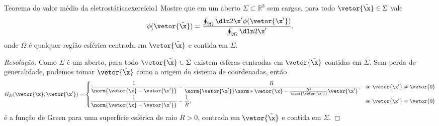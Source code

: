 \begin{exercício}{Teorema do valor médio da eletrostática}{exercício1}
    Mostre que em um aberto \(\Sigma\subset \mathbb{R}^3\) sem cargas, para todo \(\vetor{\tilde{\x}} \in \Sigma\) vale
    \begin{equation*}
        \phi(\vetor{\tilde{\x}}) = \frac{\oint_{\partial \Omega}\dln2{\x'} \phi(\vetor{\x'})}{\oint_{\partial \Omega} \dln2{\x'}},
    \end{equation*}
    onde \(\Omega\) é qualquer região esférica centrada em \(\vetor{\tilde{\x}}\) e contida em \(\Sigma\).
\end{exercício}
\begin{proof}[Resolução]
    Como \(\Sigma\) é um aberto, para todo \(\vetor{\tilde{\x}} \in \Sigma\) existem esferas centradas em \(\vetor{\tilde{\x}}\) contidas em \(\Sigma\). Sem perda de generalidade, podemos tomar \(\vetor{\tilde{\x}}\) como a origem do sistema de coordenadas, então
    \begin{equation*}
        G_D(\vetor{\x}, \vetor{\x'}) = \begin{cases}
            \dfrac{1}{\norm{\vetor{\x}-\vetor{\x'}}} - \dfrac{R}{\norm{\vetor{\x'}}\norm*{\vetor{\x} - \frac{R^2}{\norm{\vetor{\x'}}}\vetor{\x'}}},&\text{se }\vetor{\x'} \neq \vetor{0}\\
            \dfrac{1}{\norm{\vetor{\x}-\vetor{\x'}}} - \dfrac{1}{R},&\text{se }\vetor{\x'} = \vetor{0}
        \end{cases}
    \end{equation*}
    é a função de Green para uma superfície esférica de raio \(R > 0\), centrada em \(\vetor{\tilde{\x}}\) e contida em \(\Sigma\).


\end{proof}
